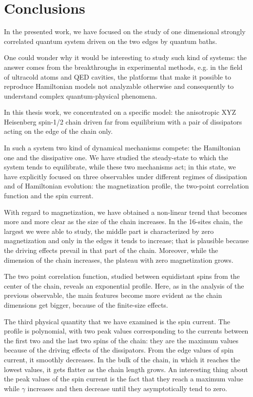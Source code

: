 \chapter*{Conclusions}

\label{Conclusions}

In the presented work, we have focused on the study of one dimensional strongly correlated quantum system driven on the two edges by quantum baths. %

One could wonder why it would be interesting to study such kind of systems: the answer comes from the breakthroughs in  experimental methods, e.g. in the field of ultracold atoms and QED cavities, the platforms that make it possible to reproduce Hamiltonian models not analyzable otherwise and consequently to understand complex quantum-physical phenomena. 

In this thesis work, we concentrated on a specific model: the anisotropic XYZ Heisenberg spin-1/2 chain driven far from equilibrium with a pair of dissipators acting on the edge of the chain only.

In such a system two kind of dynamical mechanisms compete: the Hamiltonian one and the dissipative one. We have studied the steady-state to which the system tends to equilibrate, while these two mechanisms act; in this state, we have explicitly focused on three observables under different regimes of dissipation and of Hamiltonian evolution: the magnetization profile, the two-point correlation function and the spin current.

With regard to magnetization, we have obtained a non-linear trend that becomes more and more clear as the size of the chain increases. In the 16-sites chain, the largest we were able to study, the middle part is characterized by zero magnetization and only in the edges it tends to increase; that is plausible because the driving effects prevail in that part of the chain. Moreover, while the dimension of the chain increases, the plateau with zero magnetization grows. 

The two point correlation function, studied between equidistant spins from the center of the chain, reveals an exponential profile. Here, as in the analysis of the previous observable, the main features become more evident as the chain dimensions get bigger, because of the finite-size effects.

The third physical quantity that we have examined is the spin current. The profile is polynomial, with two peak values corresponding to the currents between the first two and the last two spins of the chain: they are the maximum values because of the driving effects of the dissipators. From the edge values of spin current, it smoothly decreases. In the bulk of the chain, in which it reaches the lowest values, it gets flatter as the chain length grows. An interesting thing about the peak values of the spin current is the fact that they reach a maximum value while $\gamma$ increases and then decrease until they  asymptotically tend to zero.

